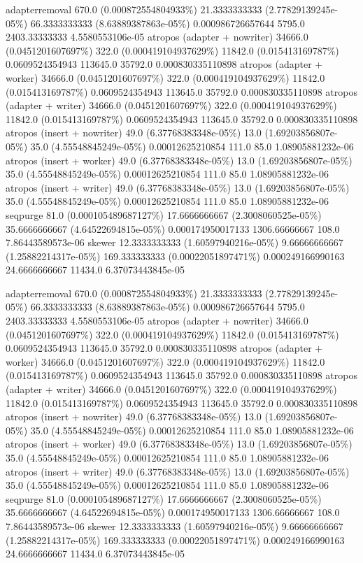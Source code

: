 adapterremoval	670.0 (0.000872554804933\%)	21.3333333333 (2.77829139245e-05\%)	66.3333333333 (8.63889387863e-05\%)	0.000986726657644	5795.0	2403.33333333	4.5580553106e-05
atropos (adapter + nowriter)	34666.0 (0.0451201607697\%)	322.0 (0.000419104937629\%)	11842.0 (0.015413169787\%)	0.0609524354943	113645.0	35792.0	0.000830335110898
atropos (adapter + worker)	34666.0 (0.0451201607697\%)	322.0 (0.000419104937629\%)	11842.0 (0.015413169787\%)	0.0609524354943	113645.0	35792.0	0.000830335110898
atropos (adapter + writer)	34666.0 (0.0451201607697\%)	322.0 (0.000419104937629\%)	11842.0 (0.015413169787\%)	0.0609524354943	113645.0	35792.0	0.000830335110898
atropos (insert + nowriter)	49.0 (6.37768383348e-05\%)	13.0 (1.69203856807e-05\%)	35.0 (4.55548845249e-05\%)	0.00012625210854	111.0	85.0	1.08905881232e-06
atropos (insert + worker)	49.0 (6.37768383348e-05\%)	13.0 (1.69203856807e-05\%)	35.0 (4.55548845249e-05\%)	0.00012625210854	111.0	85.0	1.08905881232e-06
atropos (insert + writer)	49.0 (6.37768383348e-05\%)	13.0 (1.69203856807e-05\%)	35.0 (4.55548845249e-05\%)	0.00012625210854	111.0	85.0	1.08905881232e-06
seqpurge	81.0 (0.000105489687127\%)	17.6666666667 (2.3008060525e-05\%)	35.6666666667 (4.64522694815e-05\%)	0.000174950017133	1306.66666667	108.0	7.86443589573e-06
skewer	12.3333333333 (1.60597940216e-05\%)	9.66666666667 (1.25882214317e-05\%)	169.333333333 (0.00022051897471\%)	0.000249166990163	24.6666666667	11434.0	6.37073443845e-05

adapterremoval	670.0 (0.000872554804933\%)	21.3333333333 (2.77829139245e-05\%)	66.3333333333 (8.63889387863e-05\%)	0.000986726657644	5795.0	2403.33333333	4.5580553106e-05
atropos (adapter + nowriter)	34666.0 (0.0451201607697\%)	322.0 (0.000419104937629\%)	11842.0 (0.015413169787\%)	0.0609524354943	113645.0	35792.0	0.000830335110898
atropos (adapter + worker)	34666.0 (0.0451201607697\%)	322.0 (0.000419104937629\%)	11842.0 (0.015413169787\%)	0.0609524354943	113645.0	35792.0	0.000830335110898
atropos (adapter + writer)	34666.0 (0.0451201607697\%)	322.0 (0.000419104937629\%)	11842.0 (0.015413169787\%)	0.0609524354943	113645.0	35792.0	0.000830335110898
atropos (insert + nowriter)	49.0 (6.37768383348e-05\%)	13.0 (1.69203856807e-05\%)	35.0 (4.55548845249e-05\%)	0.00012625210854	111.0	85.0	1.08905881232e-06
atropos (insert + worker)	49.0 (6.37768383348e-05\%)	13.0 (1.69203856807e-05\%)	35.0 (4.55548845249e-05\%)	0.00012625210854	111.0	85.0	1.08905881232e-06
atropos (insert + writer)	49.0 (6.37768383348e-05\%)	13.0 (1.69203856807e-05\%)	35.0 (4.55548845249e-05\%)	0.00012625210854	111.0	85.0	1.08905881232e-06
seqpurge	81.0 (0.000105489687127\%)	17.6666666667 (2.3008060525e-05\%)	35.6666666667 (4.64522694815e-05\%)	0.000174950017133	1306.66666667	108.0	7.86443589573e-06
skewer	12.3333333333 (1.60597940216e-05\%)	9.66666666667 (1.25882214317e-05\%)	169.333333333 (0.00022051897471\%)	0.000249166990163	24.6666666667	11434.0	6.37073443845e-05

